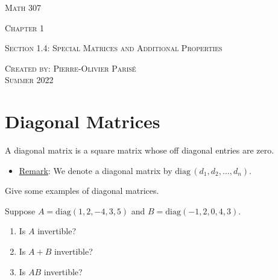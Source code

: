 \documentclass[12pt,a4paper]{article}
\newcounter{example}[section]
\begin{document}
\thispagestyle{empty}

\begin{center}
\vspace*{2.5cm}

{\Huge \textsc{Math 307}}

\vspace*{2cm}

{\LARGE \textsc{Chapter 1}} 

\vspace*{0.75cm}

\noindent\textsc{Section 1.4: Special Matrices and Additional Properties}

\vspace*{0.75cm}

\tableofcontents

\vfill

\noindent \textsc{Created by: Pierre-Olivier Paris{\'e}} \\
\textsc{Summer 2022}
\end{center}

\newpage

\section{Diagonal Matrices}
A diagonal matrix is a square matrix whose off diagonal entries are zero.

	\begin{itemize}
	\item \underline{Remark}: We denote a diagonal matrix by $\mathrm{diag}\,  (d_1 , d_2 , \ldots , d_n )$.
	\end{itemize}
	
	\begin{example}
	Give some examples of diagonal matrices.
	\end{example}
	
	\vfill
	
	\begin{example}
	Suppose $A = \mathrm{diag} (1, 2, -4, 3, 5 )$ and $B = \mathrm{diag} (-1 , 2, 0, 4, 3)$.
	\begin{multicols}{3}
		\begin{enumerate}[1)]
		\item Is $A$ invertible?
		\item Is $A + B$ invertible?
		\item Is $AB$ invertible?
		\end{enumerate}
	\end{multicols}
	\end{example}
	
\end{document}
